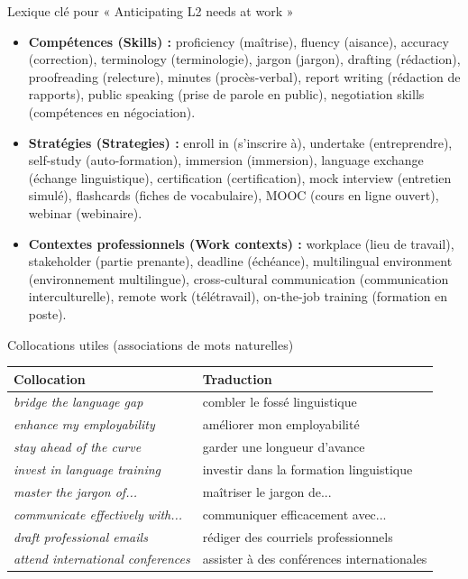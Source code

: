 \documentclass[11pt]{article}
\newcommand{\cle}[1]{{\popxbold\color{popdark}#1}}
\newcommand{\eng}[1]{\ifmmode\text{\textit{#1}}\else\begingroup\selectlanguage{english}\itshape #1\endgroup\fi}
\begin{document}
\begin{definition}{Lexique clé pour « Anticipating L2 needs at work »}
\begin{itemize}
    \item \textbf{Compétences (Skills) :} \cle{proficiency} (maîtrise), \cle{fluency} (aisance), \cle{accuracy} (correction), \cle{terminology} (terminologie), \cle{jargon} (jargon), \cle{drafting} (rédaction), \cle{proofreading} (relecture), \cle{minutes} (procès-verbal), \cle{report writing} (rédaction de rapports), \cle{public speaking} (prise de parole en public), \cle{negotiation skills} (compétences en négociation).
    \item \textbf{Stratégies (Strategies) :} \cle{enroll in} (s'inscrire à), \cle{undertake} (entreprendre), \cle{self-study} (auto-formation), \cle{immersion} (immersion), \cle{language exchange} (échange linguistique), \cle{certification} (certification), \cle{mock interview} (entretien simulé), \cle{flashcards} (fiches de vocabulaire), \cle{MOOC} (cours en ligne ouvert), \cle{webinar} (webinaire).
    \item \textbf{Contextes professionnels (Work contexts) :} \cle{workplace} (lieu de travail), \cle{stakeholder} (partie prenante), \cle{deadline} (échéance), \cle{multilingual environment} (environnement multilingue), \cle{cross-cultural communication} (communication interculturelle), \cle{remote work} (télétravail), \cle{on-the-job training} (formation en poste).
\end{itemize}
\end{definition}

\begin{exemplebox}{Collocations utiles (associations de mots naturelles)}
\begin{center}
\begin{tabularx}{\linewidth}{|X|X|}
\hline
\rowcolor{popblueL}
\textbf{Collocation} & \textbf{Traduction} \\
\hline
\eng{bridge the language gap} & combler le fossé linguistique \\
\hline
\eng{enhance my employability} & améliorer mon employabilité \\
\hline
\eng{stay ahead of the curve} & garder une longueur d'avance \\
\hline
\eng{invest in language training} & investir dans la formation linguistique \\
\hline
\eng{master the jargon of...} & maîtriser le jargon de... \\
\hline
\eng{communicate effectively with...} & communiquer efficacement avec... \\
\hline
\eng{draft professional emails} & rédiger des courriels professionnels \\
\hline
\eng{attend international conferences} & assister à des conférences internationales \\
\hline
\end{tabularx}
\end{center}
\end{exemplebox}
\end{document}
